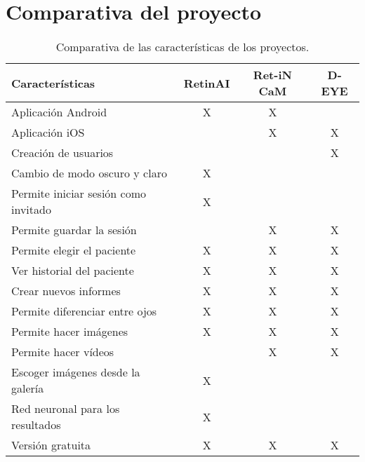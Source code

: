 \section{Comparativa del proyecto}
\begin{table}[htbp]
\centering
\begin{tabular}{lccc}
\toprule
Características & RetinAI & Ret-iN CaM & D-EYE \\
\midrule
 
Aplicación Android & X & X & \\
Aplicación iOS & & X & X \\
Creación de usuarios  & & & X \\
Cambio de modo oscuro y claro & X & & \\
Permite iniciar sesión como invitado & X &   &   \\
Permite guardar la sesión  &  & X & X \\
Permite elegir el paciente & X & X & X \\
Ver historial del paciente & X & X & X \\
Crear nuevos informes & X & X & X \\
Permite diferenciar entre ojos  & X & X & X \\
Permite hacer imágenes & X & X & X \\
Permite hacer vídeos & & X & X \\
Escoger imágenes desde la galería & X &  & \\
Red neuronal para los resultados & X &  &  \\
Versión gratuita & X & X & X \\

\bottomrule
\end{tabular}
\caption{Comparativa de las características de los proyectos.}
\label{comparativa-proyectos}
\end{table}

